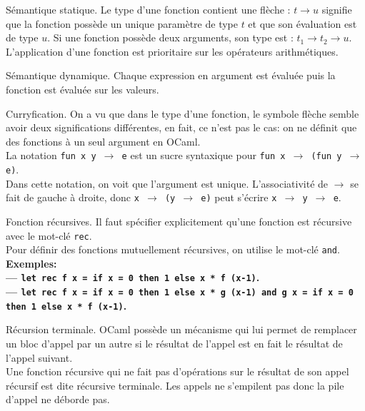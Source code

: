 \documentclass[french, 11pt]{article}
\begin{document}
\begin{defi}{Sémantique statique.}{}
    Le type d'une fonction contient une flèche : $t \to u$ signifie que la fonction possède un unique paramètre de type $t$ et que son évaluation est de type $u$.\n
    Si une fonction possède deux arguments, son type est : $t_1\to t_2 \to u$.\\
    L'application d'une fonction est prioritaire sur les opérateurs arithmétiques.
\end{defi}

\begin{defi}{Sémantique dynamique.}{}
    Chaque expression en argument est évaluée puis la fonction est évaluée sur les valeurs.
\end{defi}

\begin{defi}{Curryfication.}{}
    On a vu que dans le type d'une fonction, le symbole flèche semble avoir deux significations différentes, en fait, ce n'est pas le cas: on ne définit que des fonctions à un seul argument en OCaml.\\
    La notation \texttt{fun x y $\to$ e} est un sucre syntaxique pour \texttt{fun x $\to$ (fun y $\to$ e)}.\\
    Dans cette notation, on voit que l'argument est unique.\n
    L'associativité de $\to$ se fait de gauche à droite, donc \texttt{x $\to$ (y $\to$ e)} peut s'écrire \texttt{x $\to$ y $\to$ e}.
\end{defi}

\begin{defi}{Fonction récursives.}{}
    Il faut spécifier explicitement qu'une fonction est récursive avec le mot-clé \texttt{rec}.\\
    Pour définir des fonctions mutuellement récursives, on utilise le mot-clé \texttt{and}.\\
    \bf{Exemples:}\\
    --- \texttt{let rec f x = if x = 0 then 1 else x * f (x-1)}.\\
    --- \texttt{let rec f x = if x = 0 then 1 else x * g (x-1) and g x = if x = 0 then 1 else x * f (x-1)}.
\end{defi}

\begin{defi}{Récursion terminale.}{}
    OCaml possède un mécanisme qui lui permet de remplacer un bloc d'appel par un autre si le résultat de l'appel est en fait le résultat de l'appel suivant.\\
    Une fonction récursive qui ne fait pas d'opérations sur le résultat de son appel récursif est dite récursive terminale. Les appels ne s'empilent pas donc la pile d'appel ne déborde pas.
\end{defi}
\end{document}

